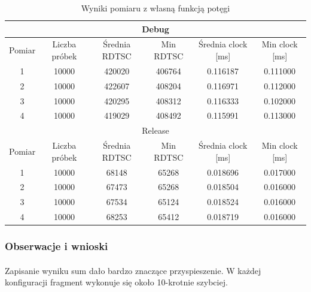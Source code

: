 \documentclass[12pt]{report}
\begin{document}
	\begin{table}[H]
		\centering
		\caption{Wyniki pomiaru z własną funkcją potęgi}
		\begin{tabular}{|c|c|c|c|c|c|} \hline
			\multicolumn{6}{|c|}{Debug} \\\hline
			Pomiar  & Liczba próbek & Średnia RDTSC & Min RDTSC & Średnia clock [ms] & Min clock [ms] \\\hline
			1 & 10000 & 420020 & 406764 & 0.116187 & 0.111000 \\\hline
			2 & 10000 & 422607 & 408204 & 0.116971 & 0.112000 \\\hline
			3 & 10000 & 420295 & 408312 & 0.116333 & 0.102000 \\\hline
			4 & 10000 & 419029 & 408492 & 0.115991 & 0.113000 \\\hline
			\hline
			\multicolumn{6}{|c|}{Release} \\\hline
			Pomiar  & Liczba próbek & Średnia RDTSC & Min RDTSC & Średnia clock [ms] & Min clock [ms] \\\hline
			1 & 10000 & 68148 & 65268 & 0.018696 & 0.017000 \\\hline
			2 & 10000 & 67473 & 65268 & 0.018504 & 0.016000 \\\hline
			3 & 10000 & 67534 & 65124 & 0.018524 & 0.016000 \\\hline
			4 & 10000 & 68253 & 65412 & 0.018719 & 0.016000 \\\hline
		\end{tabular}
	\end{table}
	
	\subsubsection{Obserwacje i wnioski}
	\paragraph{}
	Zapisanie wyniku sum dało bardzo znaczące przyspieszenie. W każdej konfiguracji fragment wykonuje się około 10-krotnie szybciej.
	
	\pagebreak
\end{document}
